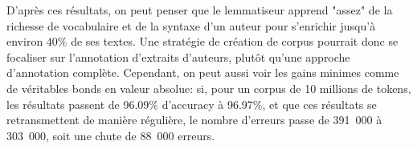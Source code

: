 D'après ces résultats, on peut penser que le lemmatiseur apprend "assez" de la richesse de vocabulaire et de la syntaxe d'un auteur pour s'enrichir jusqu'à environ 40\% de ses textes. Une stratégie de création de corpus pourrait donc se focaliser sur l'annotation d'extraits d'auteurs, plutôt qu'une approche d'annotation complète. Cependant, on peut aussi voir les gains minimes comme de véritables bonds en valeur absolue: si, pour un corpus de 10 millions de tokens, les résultats passent de 96.09\% d'accuracy à 96.97\%, et que ces résultats se retransmettent de manière régulière, le nombre d'erreurs passe de 391~000 à 303~000, soit une chute de 88~000 erreurs.

